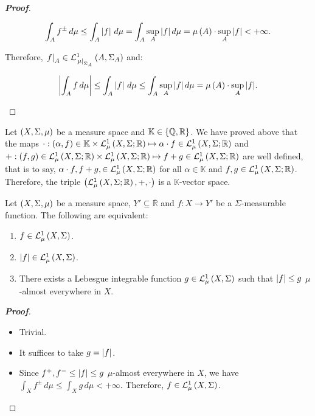 \begin{proposition}
\begin{proof}[\rm\textbf{Proof}]
\begin{enumerate}
      \begin{equation}
        \int_{A}{f^\pm\,d\mu}\leq\int_{A}{\bars{f}\,d\mu}=\int_{A}{\sup_{A}{\bars{f}}\,d\mu}=\mu\pr{A}\cdot\sup_{A}{\bars{f}}<+\infty.
      \end{equation}

      Therefore, $\rest{f}{A}\in\Leb{A}{\Sigma_A}{\rest{\mu}{\Sigma_A}}$ and:

      \begin{equation}
        \bars{\int_{A}{f\,d\mu}}\leq\int_{A}{\bars{f}\,d\mu}\leq\int_{A}{\sup_A{\bars{f}}\,d\mu}=\mu\pr{A}\cdot\sup_{A}{\bars{f}}.
      \end{equation}
    \end{enumerate}
  \end{proof}
\end{proposition}

\begin{remark}
  Let $\pr{X,\Sigma,\mu}$ be a measure space and $\mathbb{K}\in\set{\mathbb{Q},\mathbb{R}}$. We have proved above that the maps $\cdot:\pr{\alpha,f}\in\mathbb{K}\times\LebR{X}{\Sigma}{\mu}\mapsto\alpha\cdot f\in\LebR{X}{\Sigma}{\mu}$ and $+:\pr{f,g}\in\LebR{X}{\Sigma}{\mu}\times \LebR{X}{\Sigma}{\mu}\mapsto f+g\in\LebR{X}{\Sigma}{\mu}$ are well defined, that is to say, $\alpha\cdot f,f+g,\in\LebR{X}{\Sigma}{\mu}$ for all $\alpha\in\mathbb{K}$ and $f,g\in\LebR{X}{\Sigma}{\mu}$. Therefore, the triple $\pr{\LebR{X}{\Sigma}{\mu},+,\cdot}$ is a $\mathbb{K}$-vector space.
\end{remark}

\begin{theorem}
  Let $\pr{X,\Sigma,\mu}$ be a measure space, $Y'\subseteq\overline{\mathbb{R}}$ and $f:X\rightarrow Y'$ be a $\Sigma$-measurable function. The following are equivalent:

  \begin{enumerate}
    \item $f\in\Leb{X}{\Sigma}{\mu}$.
    \item $\bars{f}\in\Leb{X}{\Sigma}{\mu}$.
    \item There exists a Lebesgue integrable function $g\in\Leb{X}{\Sigma}{\mu}$ such that $\bars{f}\leq g$ $\mu$-almost everywhere in $X$.
  \end{enumerate}
  \begin{proof}[\rm\textbf{Proof}]
    \hfill
    \begin{itemize}
      \item[\boxed{1\Rightarrow2}] Trivial.
      \item[\boxed{2\Rightarrow3}] It suffices to take $g=\bars{f}$.
      \item[\boxed{3\Rightarrow1}] Since $f^+,f^-\leq\bars{f}\leq g$ $\mu$-almost everywhere in $X$, we have $\int_{X}{f^\pm\,d\mu}\leq\int_{X}{g\,d\mu}<+\infty$. Therefore, $f\in\Leb{X}{\Sigma}{\mu}$.
    \end{itemize}
  \end{proof}
\end{theorem}

